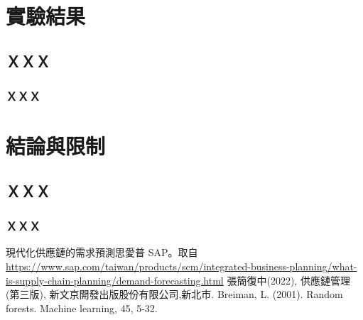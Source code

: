 \documentclass{ctexart}
\begin{document}
\section{實驗結果}
\subsection{ＸＸＸ}
\subsubsection{ＸＸＸ}

\section{結論與限制}
\subsection{ＸＸＸ}
\subsubsection{ＸＸＸ}

\clearpage %

\begin{thebibliography}{99}
現代化供應鏈的需求預測思愛普 SAP。取自 \url{https://www.sap.com/taiwan/products/scm/integrated-business-planning/what-is-supply-chain-planning/demand-forecasting.html}
張簡復中(2022), 供應鏈管理 (第三版), 新文京開發出版股份有限公司,新北市.
 Breiman, L. (2001). Random forests. Machine learning, 45, 5-32.

\end{thebibliography}
\end{document}
